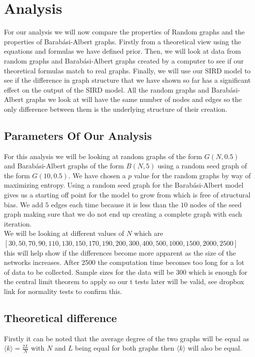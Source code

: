 \documentclass{article}
\begin{document}
        \section{Analysis}
            For our analysis we will now compare the properties of Random graphs and the properties of Barabási-Albert graphs. Firstly from a theoretical view using the equations and formulas we have defined prior. Then, we will look at data from random graphs and Barabási-Albert graphs created by a computer to see if our theoretical formulas match to real graphs. Finally, we will use our SIRD model to see if the difference in graph structure that we have shown so far has a significant effect on the output of the SIRD model. All the random graphs and Barabási-Albert graphs we look at will have the same number of nodes and edges so the only difference between them is the underlying structure of their creation.
            \subsection{Parameters Of Our Analysis}
            For this analysis we will be looking at random graphs of the form $G(N,0.5)$ and Barabási-Albert graphs of the form $B(N,5)$ using a random seed graph of the form $G(10,0.5)$. We have chosen a $p$ value for the random graphs by way of maximizing entropy. Using a random seed graph for the Barabási-Albert model gives us a starting off point for the model to grow from which is free of structural bias. We add $5$ edges each time because it is less than the $10$ nodes of the seed graph making sure that we do not end up creating a complete graph with each iteration.\\ 
            We will be looking at different values of $N$ which are\\ $ [30,50,70,90,110,130,150,170,190,200,300,400,500,1000,1500,2000,2500]$\\ this will help show if the differences become more apparent as the size of the networks increases. After 2500 the computation time becomes too long for a lot of data to be collected. Sample sizes for the data will be 300 which is enough for the central limit theorem to apply so our t tests later will be valid, see dropbox link for normality tests to confirm this.
            \subsection{Theoretical difference}
            Firstly it can be noted that the average degree of the two graphs will be equal as $\langle k \rangle = \frac{2L}{N}$ with $N$ and $L$ being equal for both graphs then $\langle k \rangle$ will also be equal.
\end{document}
